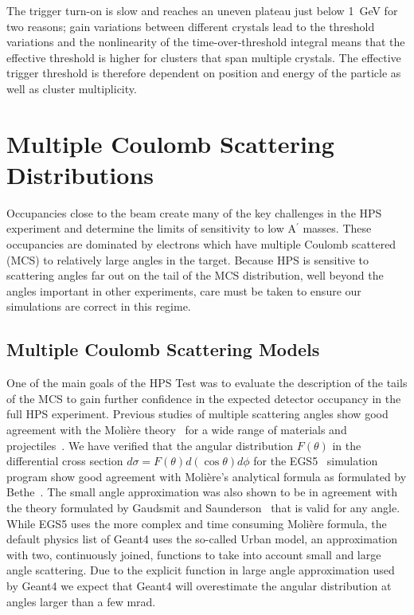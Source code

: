 \documentclass[final,3p,times,twocolumn]{elsarticle}
\newcommand{\Aprime}{A\ensuremath{^\prime}}
\newcommand{\geant}{{\sc Geant4}}
\newcommand{\egs}{{\sc EGS5}}
\newcommand{\moliere}{Moli\`{e}re}
\begin{document}
The trigger turn-on is slow and reaches an uneven plateau just below 1~GeV for two reasons;  
gain variations between different crystals lead to the threshold variations and the nonlinearity of 
the time-over-threshold integral means that the effective threshold is higher for clusters that span 
multiple crystals. The effective trigger threshold is therefore dependent on position and energy of 
the particle as well as cluster multiplicity. 










\section{Multiple Coulomb Scattering Distributions}
\label{sec:mcs}
Occupancies close to the beam create many of the key challenges in the HPS experiment
and determine the limits of sensitivity to low \Aprime{} masses.
These occupancies are dominated by electrons which have multiple Coulomb scattered (MCS) 
to relatively large angles in the target. Because HPS is sensitive to scattering angles far out on the tail of 
the MCS distribution, well beyond the angles important in other experiments, care must be taken
to ensure our simulations are correct in this regime.  

\subsection{Multiple Coulomb Scattering Models}

One of the main goals of the HPS Test was to evaluate the description of the tails of the MCS
to gain further confidence in the expected detector occupancy in the full HPS experiment. 
Previous studies of multiple scattering angles show good agreement with the \moliere{} 
theory~\cite{Moliere:1948zz} for a wide range 
of materials and projectiles~\cite{Attwood:2005zz,Shen:1978ha,Gottschalk1993467}. We have verified 
that the angular distribution $F(\theta)$ in the differential cross section 
$d\sigma = F( \theta) d(\cos\theta) d\phi$ for the \egs{}~\cite{egs5} simulation program show good 
agreement with \moliere{}'s analytical formula as formulated by Bethe~\cite{Bethe:1953va}. 
The small angle approximation was also shown to be in agreement with the theory formulated by 
Gaudsmit and Saunderson~\cite{Goudsmit:1940zza,Goudsmit:1940zz} that is valid for any angle. 
While \egs{} uses the more complex and time consuming \moliere{} 
formula, the default physics list of \geant{} uses the so-called Urban model, an approximation with two, 
continuously joined, functions to take into account 
small and large angle scattering. Due to the explicit function in large angle approximation used by 
\geant{} we expect that \geant{} will overestimate the angular distribution at angles larger than a few 
mrad.
\end{document}
